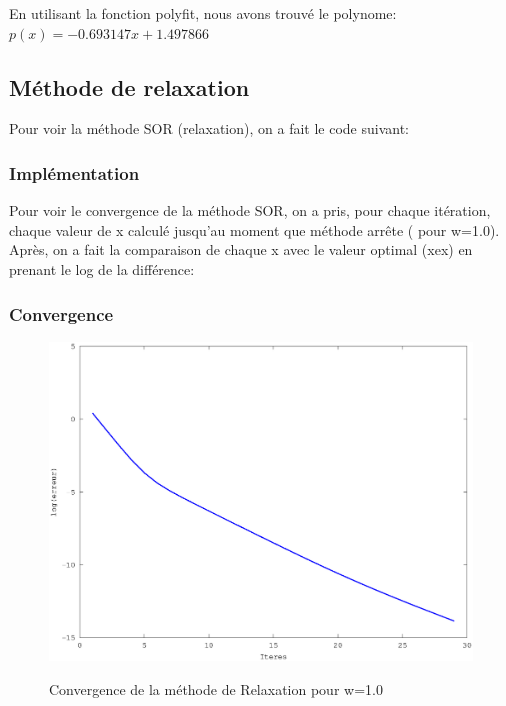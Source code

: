 \documentclass[a4paper,11pt]{article}
\begin{document}
En utilisant la fonction polyfit, nous avons trouvé le polynome: 
$p(x)= -0.693147 x + 1.497866  $


\subsection{Méthode de relaxation}
Pour voir la méthode SOR (relaxation), on a fait le code suivant:

\subsubsection{Implémentation}
\begin{multicols}{2}
  
\end{multicols}

Pour  voir le  convergence  de la  méthode SOR,  on a  pris, pour  chaque
itération, chaque valeur de x
calculé jusqu'au moment que méthode arrête ( pour w=1.0). Après, on a fait la comparaison de
chaque x avec le valeur optimal (xex) en prenant le log de la différence:


\subsubsection{Convergence}
\begin{figure}[h!]
  \begin{centering}
    \includegraphics[scale=0.5]{../relaxation_graph}
    \label{rspro2}
    \par\end{centering}
  \caption{Convergence de la méthode de Relaxation pour w=1.0}
  \label{fig:jacobi-conv}
\end{figure}
\end{document}
